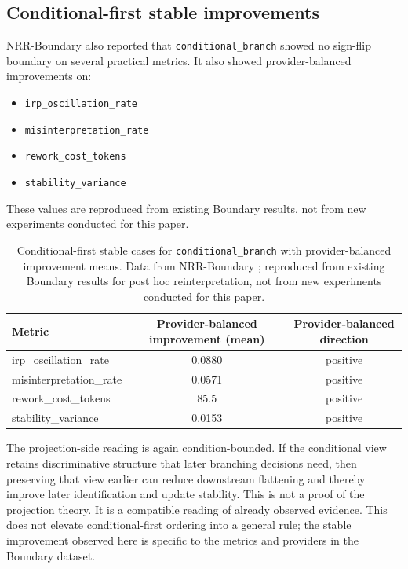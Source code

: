 \documentclass[11pt,a4paper]{article}
\begin{document}
\subsection{Conditional-first stable improvements}

NRR-Boundary \cite{saito2026boundary} also reported that \texttt{conditional\_branch} showed no sign-flip boundary on several practical metrics. It also showed provider-balanced improvements on:
\begin{itemize}
  \item \texttt{irp\_oscillation\_rate}
  \item \texttt{misinterpretation\_rate}
  \item \texttt{rework\_cost\_tokens}
  \item \texttt{stability\_variance}
\end{itemize}

These values are reproduced from existing Boundary results, not from new experiments conducted for this paper.

\begin{table}[h]
\centering
\small
\begin{tabular}{p{4.3cm}cc}
\toprule
Metric & Provider-balanced improvement (mean) & Provider-balanced direction \\
\midrule
irp\_oscillation\_rate & 0.0880 & positive \\
misinterpretation\_rate & 0.0571 & positive \\
rework\_cost\_tokens & 85.5 & positive \\
stability\_variance & 0.0153 & positive \\
\bottomrule
\end{tabular}
\caption{Conditional-first stable cases for \texttt{conditional\_branch} with provider-balanced improvement means. Data from NRR-Boundary \cite{saito2026boundary}; reproduced from existing Boundary results for post hoc reinterpretation, not from new experiments conducted for this paper.}
\label{tab:boundary_conditional_first}
\end{table}

The projection-side reading is again condition-bounded. If the conditional view retains discriminative structure that later branching decisions need, then preserving that view earlier can reduce downstream flattening and thereby improve later identification and update stability. This is not a proof of the projection theory. It is a compatible reading of already observed evidence.
This does not elevate conditional-first ordering into a general rule; the stable improvement observed here is specific to the metrics and providers in the Boundary dataset.
\end{document}
